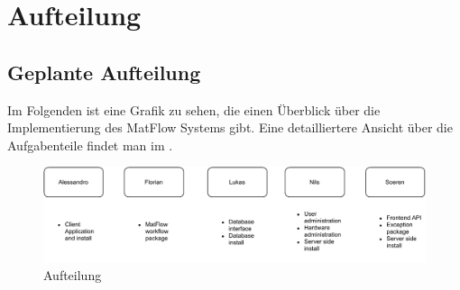 \section{Aufteilung}
\subsection{Geplante Aufteilung}
Im Folgenden ist eine Grafik zu sehen, die einen Überblick über die Implementierung des MatFlow Systems gibt. 
Eine detailliertere Ansicht über die Aufgabenteile findet man im .
\vspace{0.3in}
\begin{figure}[H]
    \centerline{\includegraphics[scale=0.8]{res/aufteilung.pdf}}
    \caption{Aufteilung}
    \end{figure}

